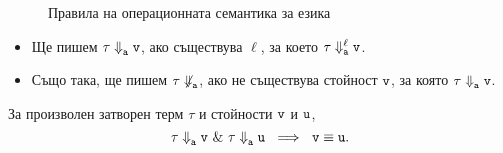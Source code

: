\begin{figure}[H]
\begin{prooftree}
\end{prooftree}

\begin{prooftree}
\end{prooftree}

\begin{prooftree}
\end{prooftree}
\caption{Правила на операционната семантика за езика \PCF}
\end{figure}



\begin{itemize}
\item 
  Ще пишем $\tau \opsem{}{a} \vv{v}$, ако съществува $\ell$, за което $\tau \opsem{\ell}{a} \vv{v}$.  
\item
  Също така, ще пишем $\tau \not\opsem{}{a}$, ако не съществува стойност $\vv{v}$, за която $\tau \opsem{}{a} \vv{v}$.  
\end{itemize}

\begin{lemma}
  За произволен затворен терм $\tau$ и стойности $\vv{v}$ и $\vv{u}$,
  \[\tau \opsem{}{a} \vv{v}\ \&\ \tau \opsem{}{a} \vv{u}\ \implies\ \vv{v} \equiv \vv{u}.\]
\end{lemma}







